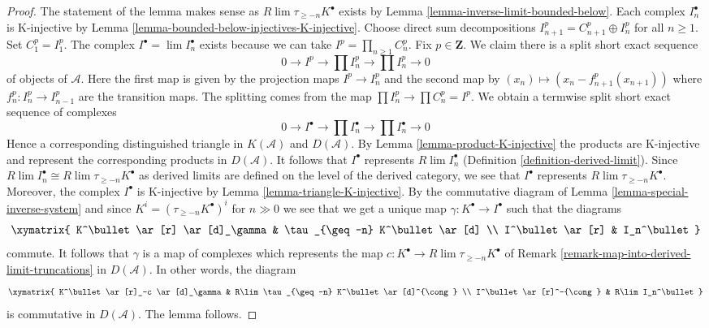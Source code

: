 \begin{proof}
The statement of the lemma makes sense as $R\lim \tau_{\geq -n}K^\bullet$
exists by Lemma \ref{lemma-inverse-limit-bounded-below}.
Each complex $I_n^\bullet$ is K-injective by
Lemma \ref{lemma-bounded-below-injectives-K-injective}.
Choose direct sum decompositions $I_{n + 1}^p = C_{n + 1}^p \oplus I_n^p$
for all $n \geq 1$. Set $C_1^p = I_1^p$. The complex
$I^\bullet = \lim I_n^\bullet$ exists because we can take
$I^p = \prod_{n \geq 1} C_n^p$. Fix $p \in \mathbf{Z}$.
We claim there is a split short exact sequence
$$
0 \to I^p \to \prod I_n^p \to \prod I_n^p \to 0
$$
of objects of $\mathcal{A}$. Here the first map is given by
the projection maps $I^p \to I_n^p$ and the second map
by $(x_n) \mapsto (x_n - f^p_{n + 1}(x_{n + 1}))$ where
$f^p_n : I_n^p \to I_{n - 1}^p$ are the transition maps.
The splitting comes from the map $\prod I_n^p \to \prod C_n^p = I^p$.
We obtain a termwise split short exact sequence of complexes
$$
0 \to I^\bullet \to \prod I_n^\bullet \to \prod I_n^\bullet \to 0
$$
Hence a corresponding distinguished triangle in $K(\mathcal{A})$
and $D(\mathcal{A})$. By Lemma \ref{lemma-product-K-injective}
the products are K-injective and represent the corresponding
products in $D(\mathcal{A})$.
It follows that $I^\bullet$ represents $R\lim I_n^\bullet$
(Definition \ref{definition-derived-limit}).
Since $R\lim I_n^\bullet \cong R\lim \tau_{\geq -n}K^\bullet$
as derived limits are defined on the level of the derived
category, we see that $I^\bullet$ represents $R\lim \tau_{\geq -n}K^\bullet$.
Moreover, the complex $I^\bullet$ is K-injective by
Lemma \ref{lemma-triangle-K-injective}.
By the commutative diagram of Lemma \ref{lemma-special-inverse-system}
and since $K^i = (\tau_{\geq -n}K^\bullet)^i$
for $n \gg 0$ we see that we get a unique map
$\gamma : K^\bullet \to I^\bullet$ such that the diagrams
$$
\xymatrix{
K^\bullet \ar[r] \ar[d]_\gamma & \tau_{\geq -n} K^\bullet \ar[d] \\
I^\bullet \ar[r] & I_n^\bullet
}
$$
commute. It follows that $\gamma$ is a map of complexes which represents
the map $c : K^\bullet \to R\lim \tau_{\geq -n}K^\bullet$ of
Remark \ref{remark-map-into-derived-limit-truncations}
in $D(\mathcal{A})$. In other words, the diagram
$$
\xymatrix{
K^\bullet \ar[r]_-c \ar[d]_\gamma & R\lim \tau_{\geq -n} K^\bullet
\ar[d]^{\cong} \\
I^\bullet \ar[r]^-{\cong} & R\lim I_n^\bullet
}
$$
is commutative in $D(\mathcal{A})$. The lemma follows.
\end{proof}

